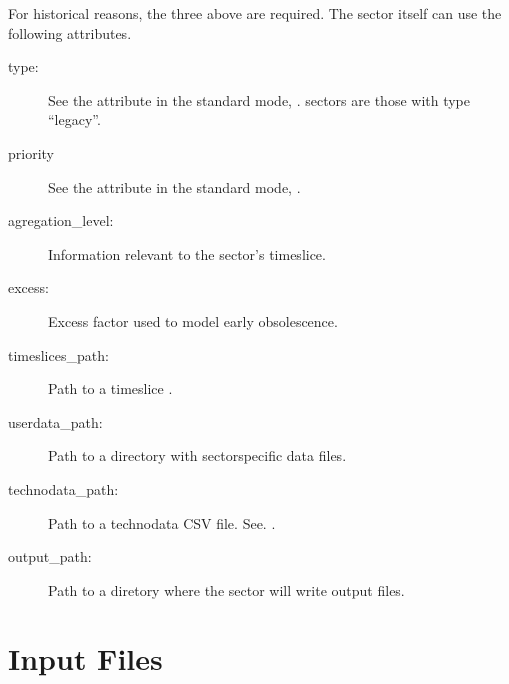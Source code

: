 \documentclass[letterpaper,10pt,english]{sphinxmanual}
\begin{document}
For historical reasons, the three  above are required. The sector
itself can use the following attributes.
\begin{description}
\item[{type:}] \leavevmode
See the attribute in the standard mode, {\hyperref[\detokenize{inputs/toml:sector-type}]{}}.  sectors
are those with type “legacy”.

\item[{priority}] \leavevmode
See the attribute in the standard mode, {\hyperref[\detokenize{inputs/toml:sector-priority}]{}}.

\item[{agregation\_level:}] \leavevmode
Information relevant to the sector’s timeslice.

\item[{excess:}] \leavevmode
Excess factor used to model early obsolescence.

\item[{timeslices\_path:}] \leavevmode
Path to a timeslice  {\hyperref[\detokenize{inputs/timeslices:inputs-legacy-timeslices}]{}}.

\item[{userdata\_path:}] \leavevmode
Path to a directory with sector\sphinxhyphen{}specific data files.

\item[{technodata\_path:}] \leavevmode
Path to a technodata CSV file. See. {\hyperref[\detokenize{inputs/technodata:inputs-technodata}]{}}.

\item[{output\_path:}] \leavevmode
Path to a diretory where the sector will write output files.

\end{description}


\section{Input Files}
\label{\detokenize{inputs/inputs_csv:input-files}}\label{\detokenize{inputs/inputs_csv::doc}}
\end{document}
